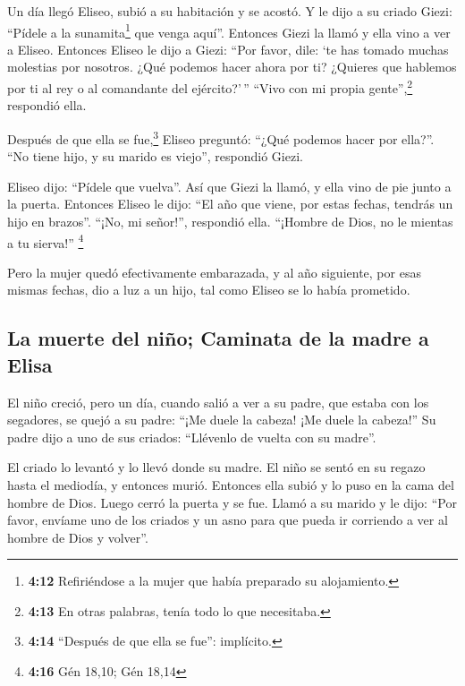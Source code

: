  Un día llegó Eliseo, subió a su habitación y se acostó.
 Y le dijo a su criado Giezi: ``Pídele a la
sunamita\footnote{\textbf{4:12} Refiriéndose a la mujer que había
  preparado su alojamiento.} que venga aquí''. Entonces Giezi la llamó y
ella vino a ver a Eliseo.  Entonces Eliseo le dijo a
Giezi: ``Por favor, dile: `te has tomado muchas molestias por nosotros.
¿Qué podemos hacer ahora por ti? ¿Quieres que hablemos por ti al rey o
al comandante del ejército?'\,'' ``Vivo con mi propia
gente'',\footnote{\textbf{4:13} En otras palabras, tenía todo lo que
  necesitaba.} respondió ella.

 Después de que ella se fue,\footnote{\textbf{4:14}
  ``Después de que ella se fue'': implícito.} Eliseo preguntó: ``¿Qué
podemos hacer por ella?''. ``No tiene hijo, y su marido es viejo'',
respondió Giezi.

 Eliseo dijo: ``Pídele que vuelva''. Así que Giezi la
llamó, y ella vino de pie junto a la puerta.  Entonces
Eliseo le dijo: ``El año que viene, por estas fechas, tendrás un hijo en
brazos''. ``¡No, mi señor!'', respondió ella. ``¡Hombre de Dios, no le
mientas a tu sierva!'' \footnote{\textbf{4:16} Gén 18,10; Gén 18,14}

 Pero la mujer quedó efectivamente embarazada, y al año
siguiente, por esas mismas fechas, dio a luz a un hijo, tal como Eliseo
se lo había prometido.

\hypertarget{la-muerte-del-niuxf1o-caminata-de-la-madre-a-elisa}{%
\subsection{La muerte del niño; Caminata de la madre a
Elisa}\label{la-muerte-del-niuxf1o-caminata-de-la-madre-a-elisa}}

 El niño creció, pero un día, cuando salió a ver a su
padre, que estaba con los segadores,  se quejó a su
padre: ``¡Me duele la cabeza! ¡Me duele la cabeza!'' Su padre dijo a uno
de sus criados: ``Llévenlo de vuelta con su madre''.

 El criado lo levantó y lo llevó donde su madre. El niño
se sentó en su regazo hasta el mediodía, y entonces murió.
 Entonces ella subió y lo puso en la cama del hombre de
Dios. Luego cerró la puerta y se fue.  Llamó a su marido
y le dijo: ``Por favor, envíame uno de los criados y un asno para que
pueda ir corriendo a ver al hombre de Dios y volver''.

